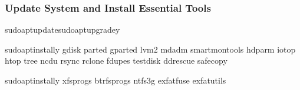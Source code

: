 \documentclass[letterpaper,10pt,english]{sphinxmanual}
\begin{document}
\subsubsection{Update System and Install Essential Tools}
\label{\detokenize{ubuntu-setup:update-system-and-install-essential-tools}}
\begin{sphinxVerbatim}[commandchars=\\\{\}]
sudoaptupdatesudoaptupgrade\PYGZhy{}y

sudoaptinstall\PYGZhy{}y
gdisk
parted
gparted
lvm2
mdadm
smartmontools
hdparm
iotop
htop
tree
ncdu
rsync
rclone
fdupes
testdisk
ddrescue
safecopy

sudoaptinstall\PYGZhy{}y
xfsprogs
btrfs\PYGZhy{}progs
ntfs\PYGZhy{}3g
exfat\PYGZhy{}fuse
exfat\PYGZhy{}utils
\end{sphinxVerbatim}
\end{document}
